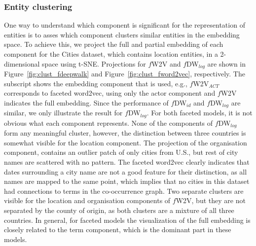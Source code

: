 \subsubsection{Entity clustering} 
One way to understand which component is significant for the representation of entities is to asses which component clusters similar entities in the embedding space. To achieve this, we project the full and partial embedding of each component for the Cities dataset, which contains location entities, in a 2-dimensional space using t-SNE.  Projections for $f$W2V and $f$DW$_{log}$  are shown in Figure~\ref{fig:clust_fdeepwalk} and Figure~\ref{fig:clust_fword2vec}, respectively. The subscript shows the embedding component that is used, e.g., $f$W2V$_{ACT}$ corresponds to faceted word2vec, using only the actor component and $f$W2V indicates the full embedding. Since the performance of $f$DW$_{id}$ and  $f$DW$_{log}$ are similar, we only illustrate the result for $f$DW$_{log}$. For both faceted models, it is not obvious what each component represents. None of the components of $f$DW$_{log}$ form any meaningful cluster, however, the distinction between three countries is somewhat visible for the location component. The projection of the organisation component, contains an outlier patch of only cities from U.S., but rest of city names are scattered with no pattern. The faceted word2vec clearly indicates that dates surrounding a city name are not a good feature for their distinction, as all names are mapped to the same point, which implies that no cities in this dataset had connections to terms in the co-occurrence graph. Two separate clusters are visible for the location and organisation components of $f$W2V, but they are not separated by the county of origin, as both clusters are a mixture of all three countries. In general, for faceted models the visualization of the full embedding is closely related to the term component, which is the dominant part in these models.
